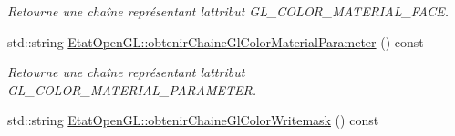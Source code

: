\begin{DoxyCompactItemize}
\begin{DoxyCompactList}\small\item\em Retourne une chaîne représentant l\textquotesingle{}attribut G\+L\+\_\+\+C\+O\+L\+O\+R\+\_\+\+M\+A\+T\+E\+R\+I\+A\+L\+\_\+\+F\+A\+C\+E. \end{DoxyCompactList}\item 
std\+::string \hyperlink{group__utilitaire_gad2b7f4282f94a24c4b5129854732c36a}{Etat\+Open\+G\+L\+::obtenir\+Chaine\+Gl\+Color\+Material\+Parameter} () const 
\begin{DoxyCompactList}\small\item\em Retourne une chaîne représentant l\textquotesingle{}attribut G\+L\+\_\+\+C\+O\+L\+O\+R\+\_\+\+M\+A\+T\+E\+R\+I\+A\+L\+\_\+\+P\+A\+R\+A\+M\+E\+T\+E\+R. \end{DoxyCompactList}\item 
\hypertarget{group__utilitaire_ga677eb5add1db0999f73a7c6febefe4d8}{}std\+::string \hyperlink{group__utilitaire_ga677eb5add1db0999f73a7c6febefe4d8}{Etat\+Open\+G\+L\+::obtenir\+Chaine\+Gl\+Color\+Writemask} () const \label{group__utilitaire_ga677eb5add1db0999f73a7c6febefe4d8}


\end{DoxyCompactItemize}
